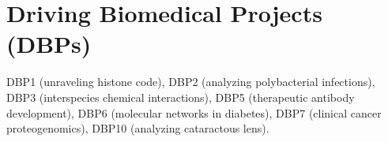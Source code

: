 \documentclass[arial,11pt]{article}
\begin{document}
\section{Driving Biomedical Projects (DBPs)}

DBP1 (unraveling histone code), DBP2 (analyzing polybacterial infections), DBP3 (interspecies chemical interactions), DBP5 (therapeutic antibody development), DBP6 (molecular networks in diabetes), DBP7 (clinical cancer proteogenomics), DBP10 (analyzing cataractous lens).





\end{document}
